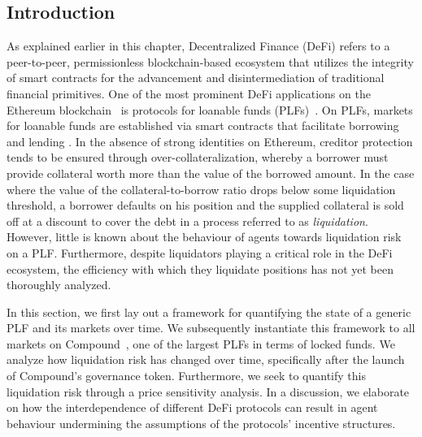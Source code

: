 \subsection{Introduction}
\label{sec:5b:introduction}

As explained earlier in this chapter, Decentralized Finance (DeFi) refers to a peer-to-peer, permissionless blockchain-based ecosystem that utilizes the integrity of smart contracts for the advancement and disintermediation of traditional financial primitives.
One of the most prominent DeFi applications on the Ethereum blockchain~\cite{wood2014ethereum} is protocols for loanable funds (PLFs)~\cite{10.1145/3419614.3423254}.
On PLFs, markets for loanable funds are established via smart contracts that facilitate borrowing and lending \cite{10.1145/3570639}.
In the absence of strong identities on Ethereum, creditor protection tends to be ensured through over-collateralization, whereby a borrower must provide collateral worth more than the value of the borrowed amount.
In the case where the value of the collateral-to-borrow ratio drops below some liquidation threshold, a borrower defaults on his position and the supplied collateral is sold off at a discount to cover the debt in a process referred to as \textit{liquidation}.
However, little is known about the behaviour of agents towards liquidation risk on a PLF.
Furthermore, despite liquidators playing a critical role in the DeFi ecosystem, the efficiency with which they liquidate positions has not yet been thoroughly analyzed.

In this section, we first lay out a framework for quantifying the state of a generic PLF and its markets over time.
We subsequently instantiate this framework to all markets on Compound~\cite{leshner2018}, one of the largest PLFs in terms of locked funds.
We analyze how liquidation risk has changed over time, specifically after the launch of Compound's governance token.
Furthermore, we seek to quantify this liquidation risk through a price sensitivity analysis.
In a discussion, we elaborate on how the interdependence of different DeFi protocols can result in agent behaviour undermining the assumptions of the protocols' incentive structures.

